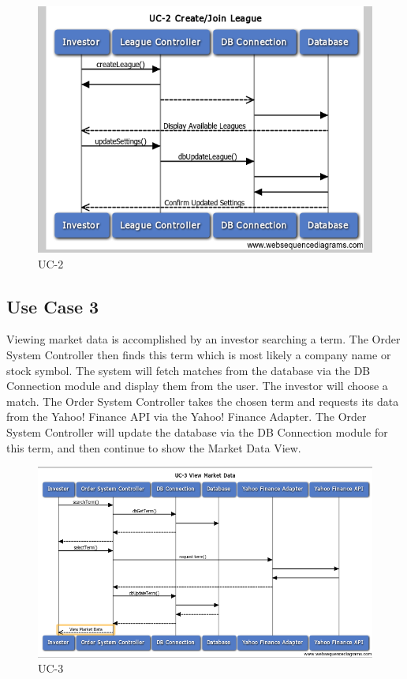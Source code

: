 \begin{figure}[H]
\centering
\includegraphics[width=5.5in]{./img/inter/UC2.png}
\caption{UC-2}
\end{figure}

\subsection{Use Case 3}
Viewing market data is accomplished by an investor searching a term. The Order
System Controller then finds this term which is most likely a company name or
stock symbol. The system will fetch matches from the database via the DB
Connection module and display them from the user. The investor will choose a
match. The Order System Controller takes the chosen term and requests its data
from the Yahoo! Finance API via the Yahoo! Finance Adapter. The Order System
Controller will update the database via the DB Connection module for this term,
and then continue to show the Market Data View.\\


\begin{figure}[H]
\centering
\includegraphics[width=5.5in]{./img/inter/UC3.png}
\caption{UC-3}
\end{figure}

